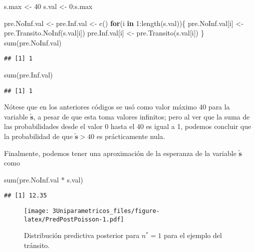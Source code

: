 \documentclass[
  10pt,
  spanish,
]{book}
\newenvironment{Shaded}{\begin{snugshade}}{\end{snugshade}}
\newcommand{\ControlFlowTok}[1]{\textcolor[rgb]{0.13,0.29,0.53}{\textbf{#1}}}
\newcommand{\DecValTok}[1]{\textcolor[rgb]{0.00,0.00,0.81}{#1}}
\newcommand{\FunctionTok}[1]{\textcolor[rgb]{0.00,0.00,0.00}{#1}}
\newcommand{\NormalTok}[1]{#1}
\newcommand{\OtherTok}[1]{\textcolor[rgb]{0.56,0.35,0.01}{#1}}
\newcommand{\SpecialCharTok}[1]{\textcolor[rgb]{0.00,0.00,0.00}{#1}}
\theoremstyle{definition}
\theoremstyle{definition}
\theoremstyle{definition}
\theoremstyle{definition}
\theoremstyle{remark}
\begin{document}
\begin{Shaded}
\begin{Highlighting}[]
\NormalTok{s.max }\OtherTok{\textless{}{-}} \DecValTok{40} 
\NormalTok{s.val }\OtherTok{\textless{}{-}} \DecValTok{0}\SpecialCharTok{:}\NormalTok{s.max}

\NormalTok{pre.NoInf.val }\OtherTok{\textless{}{-}}\NormalTok{ pre.Inf.val }\OtherTok{\textless{}{-}} \FunctionTok{c}\NormalTok{()}
\ControlFlowTok{for}\NormalTok{(i }\ControlFlowTok{in} \DecValTok{1}\SpecialCharTok{:}\FunctionTok{length}\NormalTok{(s.val))\{}
\NormalTok{  pre.NoInf.val[i] }\OtherTok{\textless{}{-}} \FunctionTok{pre.Transito.NoInf}\NormalTok{(s.val[i])}
\NormalTok{  pre.Inf.val[i] }\OtherTok{\textless{}{-}} \FunctionTok{pre.Transito}\NormalTok{(s.val[i])}
\NormalTok{\}}
\FunctionTok{sum}\NormalTok{(pre.NoInf.val)}
\end{Highlighting}
\end{Shaded}

\begin{verbatim}
## [1] 1
\end{verbatim}

\begin{Shaded}
\begin{Highlighting}[]
\FunctionTok{sum}\NormalTok{(pre.Inf.val)}
\end{Highlighting}
\end{Shaded}

\begin{verbatim}
## [1] 1
\end{verbatim}

Nótese que en los anteriores códigos se usó como valor máximo 40 para la variable \(\mathbf{\tilde{s}}\), a pesar de que esta toma valores infinitos; pero al ver que la suma de las probabilidades desde el valor 0 hasta el 40 es igual a 1, podemos concluir que la probabilidad de que \(\mathbf{\tilde{s}} > 40\) es prácticamente nula.

Finalmente, podemos tener una aproximación de la esperanza de la variable \(\mathbf{\tilde{s}}\) como

\begin{Shaded}
\begin{Highlighting}[]
\FunctionTok{sum}\NormalTok{(pre.NoInf.val }\SpecialCharTok{*}\NormalTok{ s.val)}
\end{Highlighting}
\end{Shaded}

\begin{verbatim}
## [1] 12.35
\end{verbatim}

\begin{figure}
\centering
\texttt{[image: 3Uniparametricos\_files/figure-latex/PredPostPoisson-1.pdf]}
\caption{\label{fig:PredPostPoisson}Distribución predictiva posterior para \(n^*=1\) para el ejemplo del tránsito.}
\end{figure}
\end{document}
